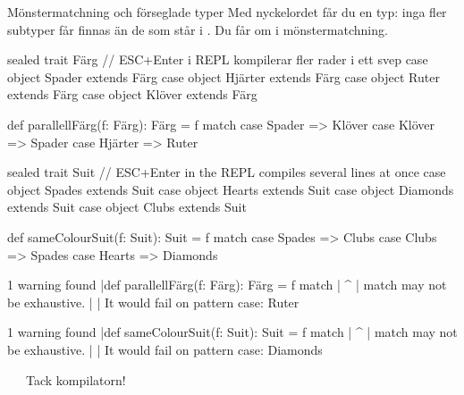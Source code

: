 \begin{Slide}{Mönstermatchning och förseglade typer}\SlideFontTiny
Med nyckelordet  får du en  typ: inga fler subtyper får finnas än de som står i .
Du får  om  i mönstermatchning.
\ifswedish
\begin{CodeSmall}
sealed trait Färg                   // ESC+Enter i REPL kompilerar fler rader i ett svep
case object Spader  extends Färg
case object Hjärter extends Färg
case object Ruter   extends Färg
case object Klöver  extends Färg

def parallellFärg(f: Färg): Färg = f match 
  case Spader  => Klöver
  case Klöver  => Spader
  case Hjärter => Ruter
\end{CodeSmall}
\else
\begin{CodeSmall}
sealed trait Suit                   // ESC+Enter in the REPL compiles several lines at once
case object Spades  extends Suit
case object Hearts extends Suit
case object Diamonds   extends Suit
case object Clubs  extends Suit

def sameColourSuit(f: Suit): Suit = f match 
  case Spades  => Clubs
  case Clubs  => Spades
  case Hearts => Diamonds
\end{CodeSmall}
\fi{}
\ifswedish
\begin{REPLsmall}
1 warning found
  |def parallellFärg(f: Färg): Färg = f match 
  |                                   ^
  |                           match may not be exhaustive.
  |
  |                           It would fail on pattern case: Ruter
\end{REPLsmall}
\else
\begin{REPLsmall}
1 warning found
  |def sameColourSuit(f: Suit): Suit = f match 
  |                                   ^
  |                           match may not be exhaustive.
  |
  |                           It would fail on pattern case: Diamonds
\end{REPLsmall}
\fi{}
 \code{:)} ~~~Tack kompilatorn!
\end{Slide}

